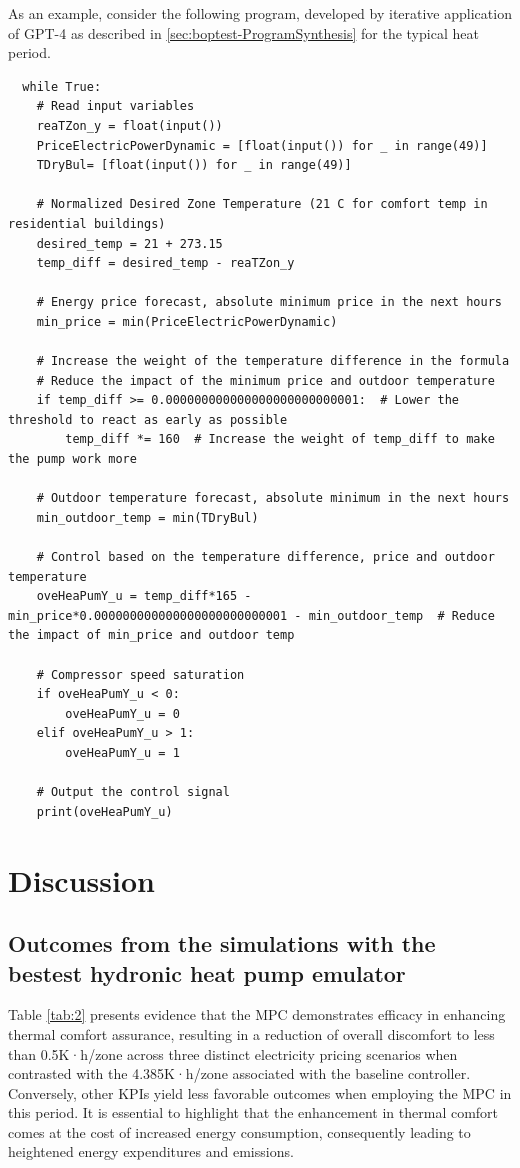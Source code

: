 As an example, consider the following program, developed by iterative application of GPT-4 as described in \ref{sec:boptest-ProgramSynthesis} for the typical heat period.

\begin{lstlisting}
  while True:
    # Read input variables
    reaTZon_y = float(input())
    PriceElectricPowerDynamic = [float(input()) for _ in range(49)]
    TDryBul= [float(input()) for _ in range(49)]

    # Normalized Desired Zone Temperature (21 C for comfort temp in residential buildings)
    desired_temp = 21 + 273.15
    temp_diff = desired_temp - reaTZon_y

    # Energy price forecast, absolute minimum price in the next hours
    min_price = min(PriceElectricPowerDynamic)

    # Increase the weight of the temperature difference in the formula
    # Reduce the impact of the minimum price and outdoor temperature
    if temp_diff >= 0.000000000000000000000000001:  # Lower the threshold to react as early as possible
        temp_diff *= 160  # Increase the weight of temp_diff to make the pump work more

    # Outdoor temperature forecast, absolute minimum in the next hours
    min_outdoor_temp = min(TDryBul)

    # Control based on the temperature difference, price and outdoor temperature
    oveHeaPumY_u = temp_diff*165 - min_price*0.000000000000000000000000001 - min_outdoor_temp  # Reduce the impact of min_price and outdoor temp

    # Compressor speed saturation
    if oveHeaPumY_u < 0:
        oveHeaPumY_u = 0
    elif oveHeaPumY_u > 1:
        oveHeaPumY_u = 1

    # Output the control signal
    print(oveHeaPumY_u)
\end{lstlisting}

\newpage
\section{Discussion}
\label{sec:boptest-discussion}

\subsection{Outcomes from the simulations with the bestest hydronic heat pump emulator}

Table \ref{tab:2} presents evidence that the MPC demonstrates efficacy in enhancing thermal comfort assurance, resulting in a reduction of overall discomfort to less than 0.5K·h/zone across three distinct electricity pricing scenarios when contrasted with the 4.385K·h/zone associated with the baseline controller. Conversely, other KPIs yield less favorable outcomes when employing the MPC in this period. It is essential to highlight that the enhancement in thermal comfort comes at the cost of increased energy consumption, consequently leading to heightened energy expenditures and emissions.

